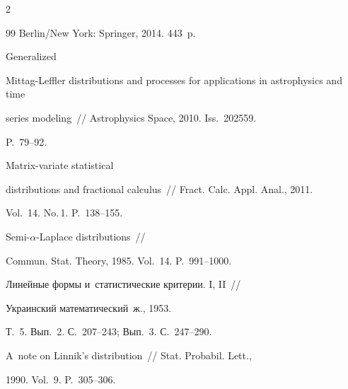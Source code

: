 \begin{multicols}{2}
{{\begin{thebibliography}{99}
Berlin/New York: Springer, 2014. 443~p.













 Generalized


Mittag-Leffler distributions and processes for applications in astrophysics and time 


series modeling~// Astrophysics Space, 2010. Iss.~202559. 


P.~79--92.







 Matrix-variate statistical


distributions and fractional calculus~// Fract. Calc.  Appl. Anal., 2011. 


Vol.~14. No.\,1. P.~138--155.







 Semi-$\alpha$-Laplace distributions~//


Commun.  Stat. Theory, 1985. Vol.~14. P.~991--1000.







 Линейные формы и~статистические критерии.  I, II~//


Украинский математический~ж., 1953.


Т.~5. Вып.~2. С.~207--243; Вып.~3. С.~247--290.













 A~note on Linnik's distribution~// Stat. Probabil. Lett., 


1990. Vol.~9. P.~305--306.












\end{thebibliography}}}
\end{multicols}
